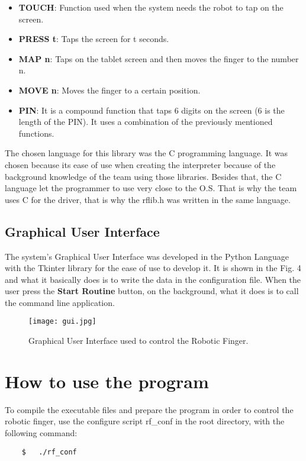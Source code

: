 \documentclass[12pt]{article}
\begin{document}
\begin{itemize}
\item \textbf{TOUCH}: Function used when the system needs the robot to tap on the screen.
\item \textbf{PRESS t}: Taps the screen for t seconds.
\item \textbf{MAP n}: Taps on the tablet screen and then moves the finger to the number n.
\item \textbf{MOVE n}: Moves the finger to a certain position.
\item \textbf{PIN}: It is a compound function that taps 6 digits on the screen (6 is the length of the PIN). It uses a combination of the previously mentioned functions.
\end{itemize}

The chosen language for this library was the C programming language. It was chosen because its ease of use when creating the interpreter because of the background knowledge of the team using those libraries. Besides that, the C language let the programmer to use very close to the O.S. That is why the team uses C for the driver, that is why the rflib.h was written in the same language.

\subsection{Graphical User Interface}
The system's Graphical User Interface was developed in the Python Language with the  Tkinter library for the ease of use to develop it. It is shown in the Fig. 4 and what it basically does is to write the data in the configuration file. When the user press the \textbf{Start Routine} button, on the background, what it does is to call the command line application.

\begin{figure}[H]
\centering
\texttt{[image: gui.jpg]}
\caption{Graphical User Interface used to control the Robotic Finger.}
\end{figure}


\section{How to use the program}
To compile the executable files and prepare the program in order to control the robotic finger, use the configure script rf\_conf in the root directory, with the following command:

\begin{center}
\begin{lstlisting}
	$	./rf_conf
\end{lstlisting}
\end{center}
\end{document}
